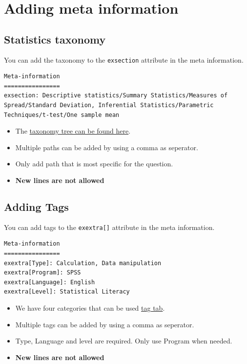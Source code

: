 \documentclass[
]{article}
\providecommand{\tightlist}{%
  \setlength{\itemsep}{0pt}\setlength{\parskip}{0pt}}
\begin{document}
\hypertarget{adding-meta-information}{%
\section{Adding meta information}\label{adding-meta-information}}

\hypertarget{statistics-taxonomy}{%
\subsection{Statistics taxonomy}\label{statistics-taxonomy}}

You can add the taxonomy to the \texttt{exsection} attribute in the meta
information.

\begin{verbatim}
Meta-information
================
exsection: Descriptive statistics/Summary Statistics/Measures of Spread/Standard Deviation, Inferential Statistics/Parametric Techniques/t-test/One sample mean
\end{verbatim}

\begin{itemize}
\tightlist
\item
  The
  \href{https://sharestats.github.io/Statistics_Taxonomy/Statistics_Taxonomy.html\#Assigning_taxonomy}{taxonomy
  tree can be found here}.
\item
  Multiple paths can be added by using a comma as seperator.
\item
  Only add path that is most specific for the question.
\item
  \textbf{New lines are not allowed}
\end{itemize}

\hypertarget{adding-tags}{%
\subsection{Adding Tags}\label{adding-tags}}

You can add tags to the \texttt{exextra{[}{]}} attribute in the meta
information.

\begin{verbatim}
Meta-information
================
exextra[Type]: Calculation, Data manipulation
exextra[Program]: SPSS
exextra[Language]: English
exextra[Level]: Statistical Literacy
\end{verbatim}

\begin{itemize}
\tightlist
\item
  We have four categories that can be used
  \href{https://sharestats.github.io/Statistics_Taxonomy/Statistics_Taxonomy.html\#Assigning_taxonomy}{tag
  tab}.
\item
  Multiple tags can be added by using a comma as seperator.
\item
  Type, Language and level are required. Only use Program when needed.
\item
  \textbf{New lines are not allowed}
\end{itemize}
\end{document}
